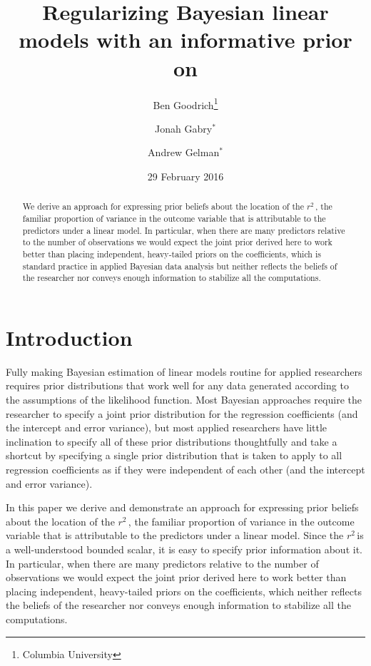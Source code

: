 \documentclass[11pt]{article}
\title{\bf Regularizing Bayesian linear models with an informative prior on \Rsq
    \vspace{.1in}}
\author{Ben Goodrich\footnote{Columbia University}
    \and Jonah Gabry$^{\ast}$
    \and Andrew Gelman$^{\ast}$
    \vspace{.1in}}
\date{29 February 2016
    \vspace{-.2in}}
\newcommand{\Rsq}{$r^2\,$}
\begin{document}
\maketitle
\thispagestyle{empty}

\begin{abstract}
\noindent We derive an approach for expressing prior beliefs about the location
of the \Rsq, the familiar proportion of variance in the outcome variable that is
attributable to the predictors under a linear model. In particular, when there
are many predictors relative to the number of observations we would expect the
joint prior derived here to work better than placing independent, heavy-tailed
priors on the coefficients, which is  standard practice in applied Bayesian data
analysis but neither reflects the beliefs of the researcher nor conveys enough
information to stabilize all the computations.
\end{abstract}


\section{Introduction}

Fully making Bayesian estimation of linear models routine for applied
researchers requires prior distributions that work well for any data generated
according to the assumptions of the likelihood function. Most Bayesian
approaches require the researcher to specify a joint prior distribution for the
regression coefficients (and the intercept and error variance), but most applied
researchers have little inclination to specify all of these prior distributions
thoughtfully and take a shortcut by specifying a single prior distribution that
is taken to apply to all regression coefficients as if they were independent of
each other (and the intercept and error variance).

In this paper we derive and demonstrate an approach for expressing  prior
beliefs about the location of the \Rsq, the familiar proportion of variance in
the outcome variable that is attributable to the predictors under a linear
model. Since the \Rsq is a well-understood bounded scalar, it is easy to specify
prior information about it. In particular, when there are many predictors
relative to the number of observations we would expect the joint prior derived
here to work better than placing independent, heavy-tailed priors on the
coefficients, which neither reflects the beliefs of the researcher nor conveys
enough information to stabilize all the computations.
\end{document}
